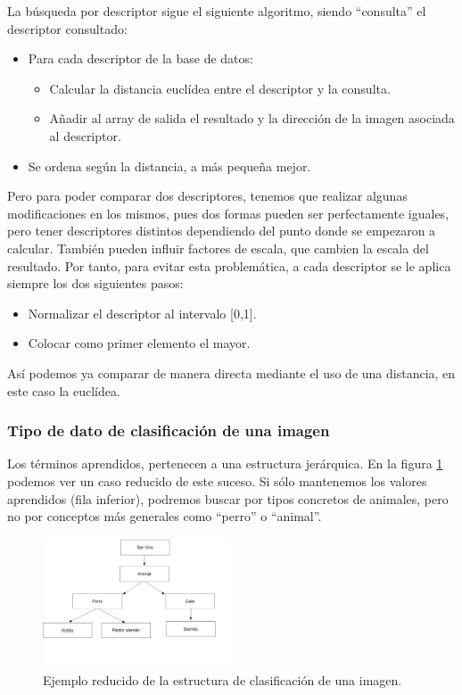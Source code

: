 La búsqueda por descriptor sigue el siguiente algoritmo, siendo ``consulta'' el descriptor consultado:
\begin{itemize}
\item Para cada descriptor de la base de datos:
\begin{itemize}
\item Calcular la distancia euclídea entre el descriptor y la consulta.
\item Añadir al array de salida el resultado y la dirección de la imagen asociada al descriptor.
\end{itemize}
\item Se ordena según la distancia, a más pequeña mejor.
\end{itemize}

Pero para poder comparar dos descriptores, tenemos que realizar algunas modificaciones en los mismos, pues dos formas pueden ser perfectamente iguales, pero tener descriptores distintos dependiendo del punto donde se empezaron a calcular. También pueden influir factores de escala, que cambien la escala del resultado. Por tanto, para evitar esta problemática, a cada descriptor se le aplica siempre los dos siguientes pasos:
\begin{itemize}
\item Normalizar el descriptor al intervalo [0,1].
\item Colocar como primer elemento el mayor.
\end{itemize}

Así podemos ya comparar de manera directa mediante el uso de una distancia, en este caso la euclídea.

\subsubsection{Tipo de dato de clasificación de una imagen}

Los términos aprendidos, pertenecen a una estructura jerárquica. En la figura \ref{arbol} podemos ver un caso reducido de este suceso. Si sólo mantenemos los valores aprendidos (fila inferior), podremos buscar por tipos concretos de animales, pero no por conceptos más generales como ``perro'' o ``animal''.\\

\begin{figure}
\begin{center}

\includegraphics[width=0.5\textwidth]{img/arbol.PNG}
\end{center}

\caption{Ejemplo reducido de la estructura de clasificación de una imagen.}
\label{arbol}
\end{figure}


